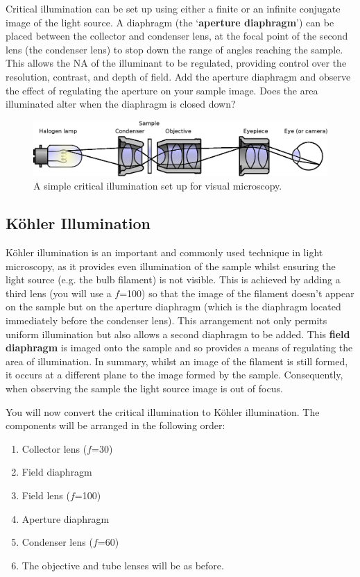 \documentclass[a4paper]{report}
\begin{document}
Critical illumination can be set up using either a finite or an
infinite conjugate image of the light source. A diaphragm (the
`\textbf{aperture diaphragm}') can be placed between the collector and
condenser lens, at the focal point of the second lens (the condenser
lens) to stop down the range of angles reaching the sample. This
allows the NA of the illuminant to be regulated, providing control
over the resolution, contrast, and depth of field. Add the aperture
diaphragm and observe the effect of regulating the aperture on your
sample image. Does the area illuminated alter when the diaphragm is
closed down?

\begin{figure}[h]
\center
\includegraphics[width=5in]{Critical_Illumination.eps}
\caption{A simple critical illumination set up for visual microscopy.}
\label{critIlum}
\end{figure}


\subsection{K\"{o}hler Illumination}
K\"{o}hler illumination is an important and commonly used technique in
light microscopy, as it provides even illumination of the sample
whilst ensuring the light source (e.g. the bulb filament) is not
visible. This is achieved by adding a third lens (you will use a
$f$=100) so that the image of the filament doesn't appear on the
sample but on the aperture diaphragm (which is the diaphragm located
immediately before the condenser lens). This arrangement not only
permits uniform illumination but also allows a second diaphragm to be
added. This \textbf{field diaphragm} is imaged onto the sample and so
provides a means of regulating the area of illumination. In summary,
whilst an image of the filament is still formed, it occurs at a
different plane to the image formed by the sample. Consequently, when
observing the sample the light source image is out of focus.

You will now convert the critical illumination to K\"{o}hler
illumination.  The components will be arranged in the following order:
\begin{enumerate}
\item Collector lens ($f$=30)
\item Field diaphragm
\item Field lens ($f$=100)
\item Aperture diaphragm
\item Condenser lens ($f$=60)
\item The objective and tube lenses will be as before. 
\end{enumerate}
\end{document}
